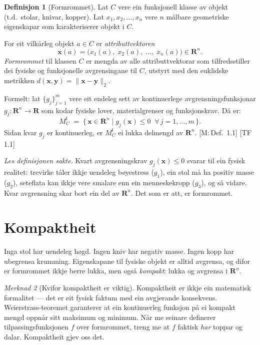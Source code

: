 \documentclass[10pt]{book}
\theoremstyle{definition}
\newtheorem{definisjon}{Definisjon}[chapter]
\theoremstyle{plain}
\theoremstyle{remark}
\newtheorem{merknad}[definisjon]{Merknad}
\newcommand{\MC}{M^{\mathsf{I}}_C}
\providecommand{\Rn}{}
\renewcommand{\Rn}{\mathbf{R}^n}
\providecommand{\R}{}
\renewcommand{\R}{\mathbf{R}}
\newcommand{\norm}[1]{\lVert #1 \rVert}
\newcommand{\TF}[1]{\textnormal{[TF\,#1]}}
\newcommand{\Mref}[1]{\textnormal{[M:\,#1]}}
\begin{document}
\begin{definisjon}[Formrommet]\label{def:formrom}
Lat $C$ vere ein funksjonell klasse av objekt (t.d.\ stolar, knivar, kopper). Lat $x_1, x_2, \ldots, x_n$ vere $n$ m\aa lbare geometriske eigenskapar som karakteriserer objekt i $C$.

For eit vilk\aa rleg objekt $a \in C$ er \emph{attributtvektoren}
\[
  \bm{x}(a) = \bigl(x_1(a),\; x_2(a),\; \ldots,\; x_n(a)\bigr) \in \Rn.
\]
\emph{Formrommet} til klassen $C$ er mengda av alle attributtvektorar som tilfredsstiller dei fysiske og funksjonelle avgrensinga\-ne til $C$, utstyrt med den euklidske metrikken $d(\bm{x}, \bm{y}) = \norm{\bm{x} - \bm{y}}_2$.

Formelt: lat $\{g_j\}_{j=1}^{m}$ vere eit endeleg sett av kontinuerlege avgrensningsfunksjonar $g_j : \Rn \to \R$ som kodar fysiske lover, materialgrenser og funksjonskrav. D\aa{} er:
\begin{equation}\label{eq:formrom}
  \MC \;=\; \bigl\{\, \bm{x} \in \Rn
    \;\big|\; g_j(\bm{x}) \leq 0
    \;\;\forall\, j = 1, \ldots, m
  \,\bigr\}.
\end{equation}
Sidan kvar $g_j$ er kontinuerleg, er $\MC$ ei lukka delmengd av $\Rn$. \Mref{Def.~1.1} \TF{1.1}
\end{definisjon}

\textit{Les definisjonen sakte.} Kvart avgrensningskrav $g_j(\bm{x}) \leq 0$ svarar til ein fysisk realitet: trevirke t\aa ler ikkje uendeleg b\o yestress ($g_1$), ein stol m\aa{} ha positiv masse ($g_2$), seteflata kan ikkje vere smalare enn ein menneskekropp ($g_3$), og s\aa{} vidare. Kvar avgrensning skar bort ein del av $\Rn$. Det som er att, er formrommet.

\section{Kompaktheit}\label{sec:formrom:kompakt}

Inga stol har uendeleg h\o gd. Ingen kniv har negativ masse. Ingen kopp har ubegrensa krumming. Eigenskapane til fysiske objekt er alltid avgrensa, og difor er formrommet ikkje berre lukka, men ogs\aa{} \emph{kompakt}: lukka og avgrensa i $\Rn$.

\begin{merknad}[Kvifor kompaktheit er viktig]
Kompaktheit er ikkje ein matematisk formalitet --- det er eit fysisk faktum med ein avgjerande konsekvens. Weierstrass-teoremet garanterer at ein kontinuerleg funksjon p\aa{} ei kompakt mengd oppn\aa r sitt maksimum og minimum. N\aa r me seinare definerer tilpassingsfunksjonen $f$ over formrommet, treng me at $f$ faktisk \emph{har} toppar og dalar. Kompaktheit gjev oss det.
\end{merknad}
\end{document}
